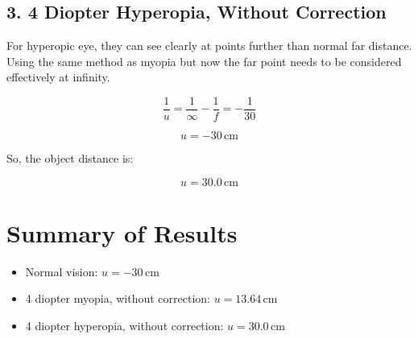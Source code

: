 \documentclass{article}
\begin{document}
\subsection*{3. 4 Diopter Hyperopia, Without Correction}
For hyperopic eye, they can see clearly at points further than normal far distance. Using the same method as myopia but now the far point needs to be considered effectively at infinity.

\[
\frac{1}{u} = \frac{1}{\infty} - \frac{1}{f} = -\frac{1}{30}
\]

\[
u = -30 \, \text{cm}
\]

So, the object distance is:

\[
u = 30.0 \, \text{cm}
\]

\section*{Summary of Results}
\begin{itemize}
    \item Normal vision: $u = -30 \, \text{cm}$
    \item 4 diopter myopia, without correction: $u = 13.64 \, \text{cm}$
    \item 4 diopter hyperopia, without correction: $u = 30.0 \, \text{cm}$
\end{itemize}
\end{document}
